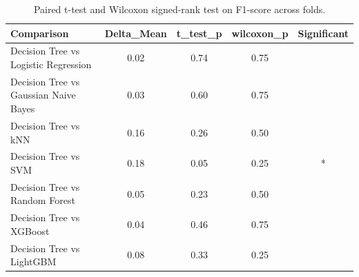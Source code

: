 \begin{table}[htbp]
\centering
\caption{Paired t-test and Wilcoxon signed-rank test on F1-score across folds.}
\label{tab:stat_tests_f1}
\begin{tabular}{lcccc}
\toprule
Comparison & Delta_Mean & t_test_p & wilcoxon_p & Significant \\
\midrule
Decision Tree vs Logistic Regression & 0.02 & 0.74 & 0.75 &  \\
Decision Tree vs Gaussian Naive Bayes & 0.03 & 0.60 & 0.75 &  \\
Decision Tree vs kNN & 0.16 & 0.26 & 0.50 &  \\
Decision Tree vs SVM & 0.18 & 0.05 & 0.25 & * \\
Decision Tree vs Random Forest & 0.05 & 0.23 & 0.50 &  \\
Decision Tree vs XGBoost & 0.04 & 0.46 & 0.75 &  \\
Decision Tree vs LightGBM & 0.08 & 0.33 & 0.25 &  \\
\bottomrule
\end{tabular}
\end{table}